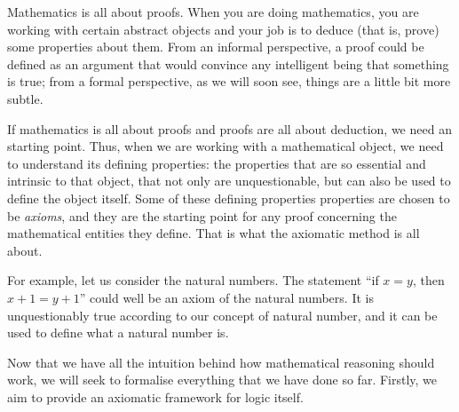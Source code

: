\begin{para}
Mathematics is all about proofs. When you are doing mathematics, you are working with certain abstract objects and your job is to deduce (that is, prove) some properties about them.
From an informal perspective, a proof could be defined as an argument that would convince any intelligent being that something is true; from a formal perspective, as we will soon see, things are a little bit more subtle.

If mathematics is all about proofs and proofs are all about deduction, we need an starting point.
Thus, when we are working with a mathematical object, we need to understand its defining properties: the properties that are so essential and intrinsic to that object, that not only are unquestionable, but can also be used to define the object itself.
Some of these defining properties properties are chosen to be \emph{axioms}, and they are the starting point for any proof concerning the mathematical entities they define.
That is what the axiomatic method is all about.

For example, let us consider the natural numbers. The statement
``if $x = y$, then $x+1 = y+1$''
could well be an axiom of the natural numbers.
It is unquestionably true according to our concept of natural number, and it can be used to define what a natural number is.

Now that we have all the intuition behind how mathematical reasoning should work, we will seek to formalise everything that we have done so far.
Firstly, we aim to provide an axiomatic framework for logic itself.
\end{para}


